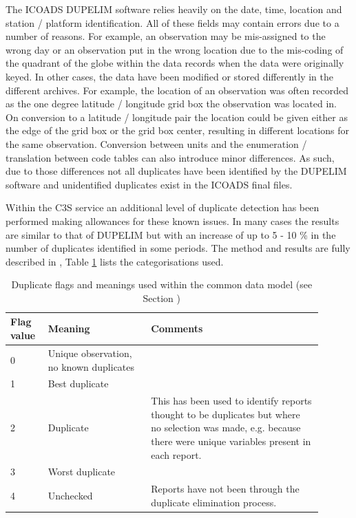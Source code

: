 The ICOADS DUPELIM software relies heavily on the date, time, location and station / platform identification. 
All of these fields may contain errors due to a number of reasons. 
For example, an observation may be mis-assigned to the wrong day or an observation put in the wrong location due to the mis-coding of the quadrant of the globe within the data records when the data were originally keyed. 
In other cases, the data have been modified or stored differently in the different archives.
For example, the location of an observation was often recorded as the one degree latitude / longitude grid box the observation was located in.
On conversion to a latitude / longitude pair the location could be given either as the edge of the grid box or the grid box center, resulting in different locations for the same observation.
Conversion between units and the enumeration / translation between code tables can also introduce minor differences.
As such, due to those differences not all duplicates have been identified by the DUPELIM software and unidentified duplicates exist in the ICOADS final files.

Within the C3S service an additional level of duplicate detection has been performed making allowances for these known issues.
In many cases the results are similar to that of DUPELIM but with an increase of up to 5 - 10 \% in the number of duplicates identified in some periods.
The method and results are fully described in \cite{Kent2019dup}, Table \ref{tab:dup_flags} lists the categorisations used.

\begin{table}[h]
\centering
\caption{Duplicate flags and meanings used within the common data model (see Section )}
\label{tab:dup_flags}
\begin{tabular}{|p{0.1\linewidth}|p{0.3\linewidth}|p{0.5\linewidth}|}
\hline
\bfseries Flag value & \bfseries Meaning & \bfseries Comments \\
\hline
0 & Unique observation, no known duplicates & \\\hline
1 & Best duplicate & \\\hline
2 & Duplicate & This has been used to identify reports thought to be duplicates but where no selection was made, e.g. because there were unique variables present in each report. \\\hline
3 & Worst duplicate & \\\hline
4 & Unchecked & Reports have not been through the duplicate elimination process.\\\hline
\end{tabular}
\end{table}

